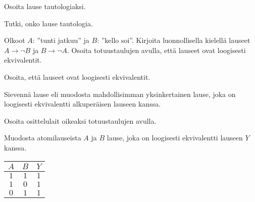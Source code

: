 \begin{kotitehtavasivu}

\begin{tehtava}
	Osoita lause tautologiaksi.
\end{tehtava}

\begin{tehtava}
	Tutki, onko lause tautologia.
\end{tehtava}

\begin{tehtava}
	Olkoot $A$: ''tunti jatkuu'' ja $B$: ''kello soi''.
	Kirjoita luonnollisella kielellä lauseet $A\to \lnot B$
	ja $B\to \lnot A$. Osoita totuustaulujen avulla, että
	lauseet ovat loogisesti ekvivalentit.
\end{tehtava}

\begin{tehtava}
	Osoita, että lauseet ovat loogisesti ekvivalentit.
\end{tehtava}

\begin{tehtava}
	Sievennä lause eli muodosta mahdollisimman
	yksinkertainen lause, joka on loogisesti ekvivalentti
	alkuperäisen lauseen kanssa.
\end{tehtava}

\begin{tehtava}
	Osoita osittelulait
	oikeaksi totuustaulujen avulla.
\end{tehtava}

\begin{tehtava}
	Muodosta atomilauseista $A$ ja $B$ lause, joka on
	loogisesti ekvivalentti lauseen $Y$ kanssa.
	\begin{center}
	\begin{tabular}{|c|c|c|}\hline
	$A$ & $B$ & $Y$\\ \hline
	$1$ & $1$ & $1$\\
	$1$ & $0$ & $1$\\
	$0$ & $1$ & $1$\\


\end{tabular}
\end{center}
\end{tehtava}
\end{kotitehtavasivu}
